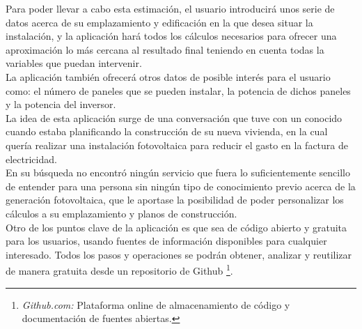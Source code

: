 \documentclass[11pt]{report}
\begin{document}
Para poder llevar a cabo esta estimación, el usuario introducirá unos serie de datos acerca de su emplazamiento y edificación en la que desea situar la instalación, y la aplicación hará todos los cálculos necesarios para ofrecer una aproximación lo más cercana al resultado final teniendo en cuenta todas la variables que puedan intervenir.\\

La aplicación también ofrecerá otros datos de posible interés para el usuario como: el número de paneles que se pueden instalar, la potencia de dichos paneles y la potencia del inversor.\\

La idea de esta aplicación surge de una conversación que tuve con un conocido cuando estaba planificando la construcción de su nueva vivienda, en la cual quería realizar una instalación fotovoltaica para reducir el gasto en la factura de electricidad.\\

En su búsqueda no encontró ningún servicio que fuera lo suficientemente sencillo de entender para una persona sin ningún tipo de conocimiento previo acerca de la generación fotovoltaica, que le aportase la posibilidad de poder personalizar los cálculos a su emplazamiento y planos de construcción.\\

Otro de los puntos clave de la aplicación es que sea de código abierto y gratuita para los usuarios, usando fuentes de información disponibles para cualquier interesado. Todos los pasos y operaciones se podrán obtener, analizar y reutilizar de manera gratuita desde un repositorio de Github \footnote{\textit{Github.com:} Plataforma online de almacenamiento de código y documentación de fuentes abiertas.}.\\
\end{document}
